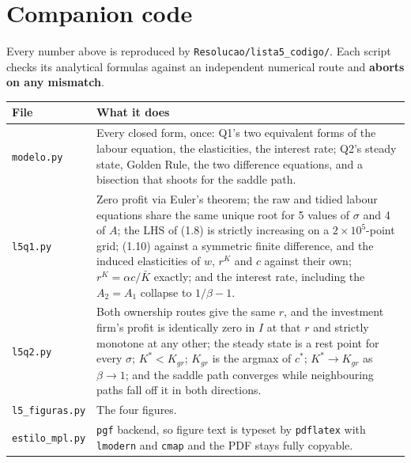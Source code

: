 \documentclass[11pt, a4paper]{article}
\newcommand{\stst}{^{\ast}}
\newcommand{\Kb}{\bar K}
\begin{document}
\section*{Companion code}

Every number above is reproduced by \texttt{Resolucao/lista5\_codigo/}. Each script checks
its analytical formulas against an independent numerical route and \textbf{aborts on any
mismatch}.

\begin{center}
\small
\begin{tabular}{@{}lp{10.4cm}@{}}
\toprule
\textbf{File} & \textbf{What it does} \\
\midrule
\texttt{modelo.py} & Every closed form, once: Q1's two equivalent forms of the labour
equation, the elasticities, the interest rate; Q2's steady state, Golden Rule, the two
difference equations, and a bisection that shoots for the saddle path. \\
\texttt{l5q1.py} & Zero profit via Euler's theorem; the raw and tidied labour equations share
the same unique root for 5 values of $\sigma$ and 4 of $A$; the LHS of (1.8) is strictly
increasing on a $2\times10^5$-point grid; (1.10) against a symmetric finite difference, and
the induced elasticities of $w$, $r^K$ and $c$ against their own; $r^K=\alpha c/\Kb$
exactly; and the interest rate, including the $A_2=A_1$ collapse to $1/\beta-1$. \\
\texttt{l5q2.py} & Both ownership routes give the same $r$, and the investment firm's profit
is identically zero in $I$ at that $r$ and strictly monotone at any other; the steady state
is a rest point for every $\sigma$; $K\stst<K_{gr}$; $K_{gr}$ is the argmax of $c\stst$;
$K\stst\to K_{gr}$ as $\beta\to1$; and the saddle path converges while neighbouring paths
fall off it in both directions. \\
\texttt{l5\_figuras.py} & The four figures. \\
\texttt{estilo\_mpl.py} & \texttt{pgf} backend, so figure text is typeset by
\texttt{pdflatex} with \texttt{lmodern} and \texttt{cmap} and the PDF stays fully copyable. \\
\bottomrule
\end{tabular}
\end{center}
\end{document}

